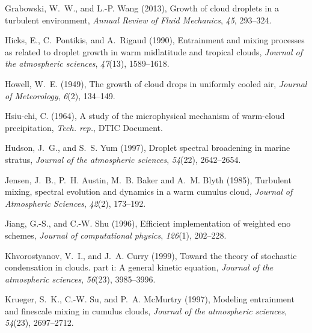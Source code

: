 \documentclass[draft,linenumbers]{agujournal}
\begin{document}
\begin{thebibliography}{60}
Grabowski, W.~W., and L.-P. Wang (2013), Growth of cloud droplets in a
  turbulent environment, \textit{Annual Review of Fluid Mechanics},
  \textit{45}, 293--324.

Hicks, E., C.~Pontikis, and A.~Rigaud (1990), Entrainment and mixing processes
  as related to droplet growth in warm midlatitude and tropical clouds,
  \textit{Journal of the atmospheric sciences}, \textit{47}(13), 1589--1618.

Howell, W.~E. (1949), The growth of cloud drops in uniformly cooled air,
  \textit{Journal of Meteorology}, \textit{6}(2), 134--149.

Hsiu-chi, C. (1964), A study of the microphysical mechanism of warm-cloud
  precipitation, \textit{Tech. rep.}, DTIC Document.

Hudson, J.~G., and S.~S. Yum (1997), Droplet spectral broadening in marine
  stratus, \textit{Journal of the atmospheric sciences}, \textit{54}(22),
  2642--2654.

Jensen, J.~B., P.~H. Austin, M.~B. Baker and A.~M. Blyth (1985), Turbulent mixing, spectral evolution and dynamics in a warm cumulus cloud, \textit{Journal of Atmospheric Sciences},
  \textit{42}(2), 173--192.
  
Jiang, G.-S., and C.-W. Shu (1996), Efficient implementation of weighted eno
  schemes, \textit{Journal of computational physics}, \textit{126}(1),
  202--228.

Khvorostyanov, V.~I., and J.~A. Curry (1999), Toward the theory of stochastic
  condensation in clouds. part i: A general kinetic equation, \textit{Journal
  of the atmospheric sciences}, \textit{56}(23), 3985--3996.

Krueger, S.~K., C.-W. Su, and P.~A. McMurtry (1997), Modeling entrainment and
  finescale mixing in cumulus clouds, \textit{Journal of the atmospheric
  sciences}, \textit{54}(23), 2697--2712.


\end{thebibliography}
\end{document}
